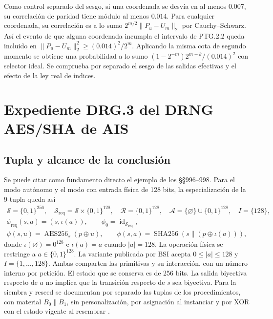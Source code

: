 \documentclass[11pt,a4paper]{article}
\newcommand{\bits}{\{0,1\}}
\newcommand{\AES}{\operatorname{AES256}}
\newcommand{\SHA}{\operatorname{SHA256}}
\begin{document}
Como control separado del sesgo, si una coordenada se desvía
en al menos \(0.007\), su correlación de paridad tiene
módulo al menos \(0.014\). Para cualquier coordenada, su
correlación es a lo sumo \(2^{m/2}\|P_u-U_m\|_2\) por
Cauchy--Schwarz. Así el evento de que alguna coordenada
incumpla el intervalo de PTG.2.2 queda incluido en
\(\|P_u-U_m\|_2^2\ge (0.014)^2/2^m\). Aplicando la misma
cota de segundo momento se obtiene una probabilidad a lo
sumo \((1-2^{-m})2^{m-k}/(0.014)^2\) con selector ideal.
Se comprueba por separado el sesgo de las salidas efectivas
y el efecto de la ley real de índices.


\section{Expediente DRG.3 del DRNG AES/SHA de AIS}
\label{sec:drg}

\subsection{Tupla y alcance de la conclusión}

Se puede citar como fundamento directo el ejemplo de los §§996--998.
Para el modo autónomo y el modo con entrada física de 128 bits, la
especialización de la 9-tupla queda así
\[
\begin{gathered}
\mathcal S=\bits^{256},\quad
\mathcal S_{\mathrm{req}}=\mathcal S\times\bits^{128},\quad
\mathcal R=\bits^{128},\quad
\mathcal A=\{\varnothing\}\cup\bits^{128},\quad I=\{128\},\\
\phi_{\mathrm{req}}(s,a)=(s,\iota(a)),\qquad
\phi_0=\operatorname{id}_{\mathcal S_{\mathrm{req}}},\\
\psi(s,u)=\AES_s(p\oplus u),\qquad
\phi(s,a)=\SHA(s\|(p\oplus\iota(a))),
\end{gathered}
\]
donde $\iota(\varnothing)=0^{128}$ e $\iota(a)=a$ cuando $|a|=128$.
La operación física se restringe a $a\in\bits^{128}$. La variante
publicada por BSI acepta $0\le |a|\le128$ y $I=\{1,\ldots,128\}$.
Ambas comparten las primitivas y su interacción, con un número interno
por petición. El estado que se conserva es de 256 bits. La salida
biyectiva respecto de $a$ no implica que la transición respecto de $s$
sea biyectiva. Para la siembra y reseed se documentan por separado
las tuplas de los procedimientos, con material $B_0\|B_1$,
sin personalización, por asignación al instanciar y por XOR con el estado vigente al resembrar
\cite[§§127--164, 207, 976, 996--998]{ais}.
\end{document}
